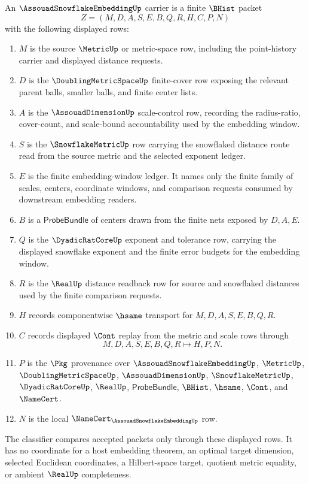 \begin{definition}
\label{def:assouad-snowflake-embedding-carrier}
An $\AssouadSnowflakeEmbeddingUp$ carrier is a finite $\BHist$ packet
$$
Z=(M,D,A,S,E,B,Q,R,H,C,P,N)
$$
with the following displayed rows:
\begin{enumerate}
\item $M$ is the source $\MetricUp$ or metric-space row, including the point-history carrier and displayed distance requests.
\item $D$ is the $\DoublingMetricSpaceUp$ finite-cover row exposing the relevant parent balls, smaller balls, and finite center lists.
\item $A$ is the $\AssouadDimensionUp$ scale-control row, recording the radius-ratio, cover-count, and scale-bound accountability used by the embedding window.
\item $S$ is the $\SnowflakeMetricUp$ row carrying the snowflaked distance route read from the source metric and the selected exponent ledger.
\item $E$ is the finite embedding-window ledger. It names only the finite family of scales, centers, coordinate windows, and comparison requests consumed by downstream embedding readers.
\item $B$ is a $\mathsf{ProbeBundle}$ of centers drawn from the finite nets exposed by $D,A,E$.
\item $Q$ is the $\DyadicRatCoreUp$ exponent and tolerance row, carrying the displayed snowflake exponent and the finite error budgets for the embedding window.
\item $R$ is the $\RealUp$ distance readback row for source and snowflaked distances used by the finite comparison requests.
\item $H$ records componentwise $\hsame$ transport for $M,D,A,S,E,B,Q,R$.
\item $C$ records displayed $\Cont$ replay from the metric and scale rows through
$$
M,D,A,S,E,B,Q,R \longmapsto H,P,N .
$$
\item $P$ is the $\Pkg$ provenance over $\AssouadSnowflakeEmbeddingUp$, $\MetricUp$, $\DoublingMetricSpaceUp$, $\AssouadDimensionUp$, $\SnowflakeMetricUp$, $\DyadicRatCoreUp$, $\RealUp$, $\mathsf{ProbeBundle}$, $\BHist$, $\hsame$, $\Cont$, and $\NameCert$.
\item $N$ is the local $\NameCert_{\AssouadSnowflakeEmbeddingUp}$ row.
\end{enumerate}
The classifier compares accepted packets only through these displayed rows. It has no coordinate for a host embedding theorem, an optimal target dimension, selected Euclidean coordinates, a Hilbert-space target, quotient metric equality, or ambient $\RealUp$ completeness.
\end{definition}

